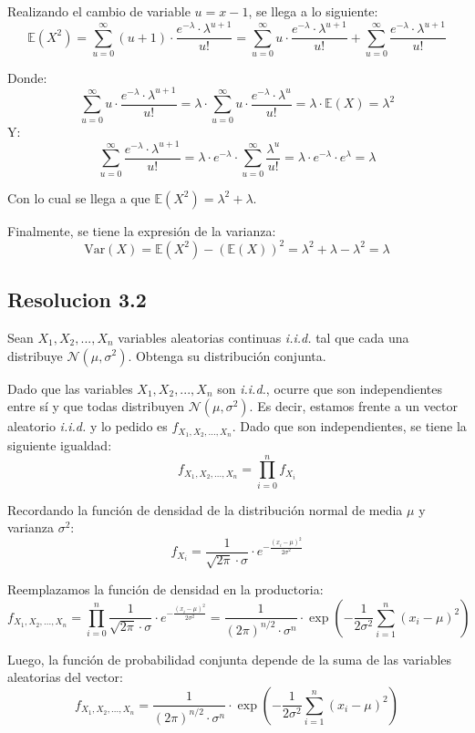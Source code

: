 \documentclass[
  11pt,
  letterpaper,
   addpoints,
   answers
  ]{exam}
\begin{document}
\begin{questions}
\begin{solution}
Realizando el cambio de variable \( u = x - 1 \), se llega a lo siguiente:
\[
\mathbb{E}(X^2) = \sum_{u=0}^{\infty} (u + 1) \cdot \frac{e^{-\lambda} \cdot \lambda^{u+1}}{u!} = \sum_{u=0}^{\infty} u \cdot \frac{e^{-\lambda} \cdot \lambda^{u+1}}{u!} + \sum_{u=0}^{\infty} \frac{e^{-\lambda} \cdot \lambda^{u+1}}{u!}
\]

Donde:
\[
\sum_{u=0}^{\infty} u \cdot \frac{e^{-\lambda} \cdot \lambda^{u+1}}{u!} = \lambda \cdot \sum_{u=0}^{\infty} u \cdot \frac{e^{-\lambda} \cdot \lambda^u}{u!} = \lambda \cdot \mathbb{E}(X) = \lambda^2
\]
Y:
\[
\sum_{u=0}^{\infty} \frac{e^{-\lambda} \cdot \lambda^{u+1}}{u!} = \lambda \cdot e^{-\lambda} \cdot \sum_{u=0}^{\infty} \frac{\lambda^u}{u!} = \lambda \cdot e^{-\lambda} \cdot e^{\lambda} = \lambda
\]

Con lo cual se llega a que \( \mathbb{E}(X^2) = \lambda^2 + \lambda \).

Finalmente, se tiene la expresión de la varianza:
\[
\text{Var}(X) = \mathbb{E}(X^2) - (\mathbb{E}(X))^2 = \lambda^2 + \lambda - \lambda^2 = \lambda
\]
\subsection*{Resolucion 3.2}
Sean \( X_1, X_2, ..., X_n \) variables aleatorias continuas \textit{i.i.d.} tal que cada una distribuye \( \mathcal{N}(\mu, \sigma^2) \). Obtenga su distribución conjunta.

Dado que las variables \( X_1, X_2, ..., X_n \) son \textit{i.i.d.}, ocurre que son independientes entre sí y que todas distribuyen \( \mathcal{N}(\mu, \sigma^2) \). Es decir, estamos frente a un vector aleatorio \textit{i.i.d.} y lo pedido es \( f_{X_1, X_2, ..., X_n} \). Dado que son independientes, se tiene la siguiente igualdad:
\[
f_{X_1, X_2, ..., X_n} = \prod_{i=0}^{n} f_{X_i}
\]

Recordando la función de densidad de la distribución normal de media \( \mu \) y varianza \( \sigma^2 \):
\[
f_{X_i} = \frac{1}{\sqrt{2\pi} \cdot \sigma} \cdot e^{-\frac{(x_i - \mu)^2}{2\sigma^2}}
\]

Reemplazamos la función de densidad en la productoria:
\[
f_{X_1, X_2, ..., X_n} = \prod_{i=0}^{n} \frac{1}{\sqrt{2\pi} \cdot \sigma} \cdot e^{-\frac{(x_i - \mu)^2}{2\sigma^2}} = \frac{1}{(2\pi)^{n/2} \cdot \sigma^n} \cdot \exp\left(-\frac{1}{2\sigma^2} \sum_{i=1}^{n} (x_i - \mu)^2\right)
\]

Luego, la función de probabilidad conjunta depende de la suma de las variables aleatorias del vector:
\[
f_{X_1, X_2, ..., X_n} = \frac{1}{(2\pi)^{n/2} \cdot \sigma^n} \cdot \exp\left(-\frac{1}{2\sigma^2} \sum_{i=1}^{n} (x_i - \mu)^2\right)
\]

\end{solution}
\end{questions}
\end{document}
